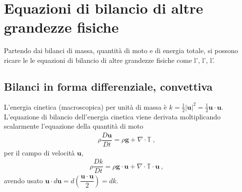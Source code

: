 \documentclass[letterpaper,10pt,english]{jupyterBook}
\begin{document}
\chapter{Equazioni di bilancio di altre grandezze fisiche}
\label{\detokenize{ch/continuum/derived-balances:equazioni-di-bilancio-di-altre-grandezze-fisiche}}\label{\detokenize{ch/continuum/derived-balances:continuum-derived-balances}}\label{\detokenize{ch/continuum/derived-balances::doc}}


\sphinxAtStartPar
Partendo dai bilanci di massa, quantità di moto e di energia totale, si possono ricare le le equazioni di bilancio di altre grandezze fisiche come l’, l’, l’.


\section{Bilanci in forma differenziale, convettiva}
\label{\detokenize{ch/continuum/derived-balances:bilanci-in-forma-differenziale-convettiva}}
\sphinxAtStartPar
{} L’energia cinetica (macroscopica) per unità di massa è \(k = \frac{1}{2}|\mathbf{u}|^2 = \frac{1}{2} \mathbf{u} \cdot \mathbf{u}\). L’equazione di bilancio dell’energia cinetica viene derivata moltiplicando scalarmente l’equazione della quantità di moto
\begin{equation*}
\begin{split}\rho \dfrac{D \mathbf{u}}{Dt} = \rho \mathbf{g} + \nabla \cdot \mathbb{T} \ ,\end{split}
\end{equation*}
\sphinxAtStartPar
per il campo di velocità \(\mathbf{u}\),
\begin{equation*}
\begin{split}\rho \dfrac{D k}{Dt} = \rho \mathbf{g} \cdot \mathbf{u} + \nabla \cdot \mathbb{T} \cdot \mathbf{u} \ ,\end{split}
\end{equation*}
\sphinxAtStartPar
avendo usato \(\mathbf{u} \cdot d \mathbf{u} = d \left( \dfrac{\mathbf{u} \cdot \mathbf{u}}{2} \right) = dk\).
\end{document}
